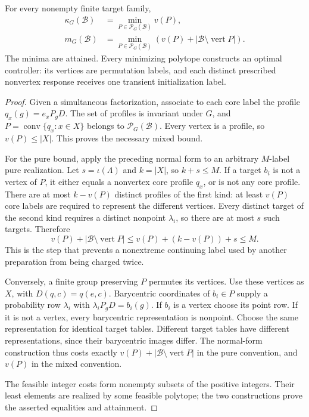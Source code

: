 \begin{theorem}
\label{thm:r77-shared-polytope}
For every nonempty finite target family,
\begin{align}
 \kappa_G(\mathcal B)
   &=\min_{P\in\mathcal P_G(\mathcal B)}v(P),
       \label{eq:r77-polytope-mixed}\\
 m_G(\mathcal B)
   &=\min_{P\in\mathcal P_G(\mathcal B)}
       \left(v(P)+|\mathcal B\setminus\operatorname{vert}P|\right).
       \label{eq:r77-polytope-pure}
\end{align}
The minima are attained.  Every minimizing polytope constructs an optimal
controller: its vertices are permutation labels, and each distinct
prescribed nonvertex response receives one transient initialization label.
\end{theorem}
\begin{proof}
Given a simultaneous factorization, associate to each core label the
profile $q_x(g)=e_xP_gD$.  The set of profiles is invariant under $G$,
and $P=\operatorname{conv}\{q_x:x\in X\}$ belongs to
$\mathcal P_G(\mathcal B)$.  Every vertex is a profile, so $v(P)\le|X|$.
This proves the necessary mixed bound.

For the pure bound, apply the preceding normal form to an arbitrary
$M$-label pure realization.  Let $s=\iota(\Lambda)$ and $k=|X|$, so
$k+s\le M$.  If a target $b_i$ is not a vertex of $P$, it either equals
a nonvertex core profile $q_x$, or is not any core profile.  There are
at most $k-v(P)$ distinct profiles of the first kind: at least $v(P)$
core labels are required to represent the different vertices.  Every
distinct target of the second kind requires a distinct nonpoint
$\lambda_i$, so there are at most $s$ such targets.  Therefore
\[
 v(P)+|\mathcal B\setminus\operatorname{vert}P|
       \le v(P)+(k-v(P))+s\le M.
\]
This is the step that prevents a nonextreme continuing label used by
another preparation from being charged twice.

Conversely, a finite group preserving $P$ permutes its vertices.  Use
these vertices as $X$, with $D(q,c)=q(e,c)$.  Barycentric coordinates
of $b_i\in P$ supply a probability row $\lambda_i$ with
$\lambda_iP_gD=b_i(g)$.  If $b_i$ is a vertex choose its point row.
If it is not a vertex, every barycentric representation is nonpoint.
Choose the same representation for identical target tables.  Different
target tables have different representations, since their barycentric
images differ.  The normal-form construction thus costs exactly
$v(P)+|\mathcal B\setminus\operatorname{vert}P|$ in the pure convention,
and $v(P)$ in the mixed convention.

The feasible integer costs form nonempty subsets of the positive
integers.  Their least elements are realized by some feasible polytope;
the two constructions prove the asserted equalities and attainment.
\end{proof}

